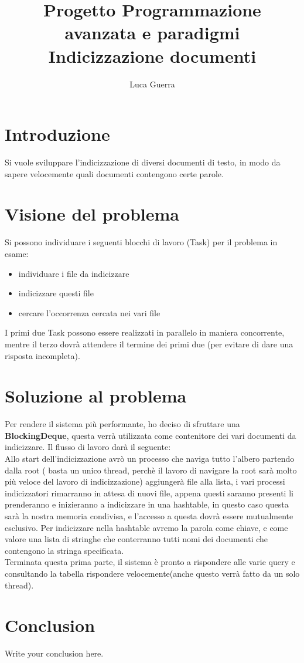 \documentclass{article}
\begin{document}
\title{Progetto Programmazione avanzata e paradigmi \\ Indicizzazione documenti}

\author{Luca Guerra}

\maketitle

\section{Introduzione}
Si vuole sviluppare l'indicizzazione di diversi documenti di testo, in modo da sapere velocemente quali documenti contengono certe parole.

\section{Visione del problema}
Si possono individuare i seguenti blocchi di lavoro (Task) per il problema in esame:
\begin{itemize}
  \item individuare i file da indicizzare
  \item indicizzare questi file
  \item cercare l'occorrenza cercata nei vari file
\end{itemize} 
I primi due Task possono essere realizzati in parallelo in maniera concorrente, mentre il terzo dovrà attendere il termine dei primi due (per evitare di dare una risposta incompleta).

\section{Soluzione al problema}

Per rendere il sistema più performante, ho deciso di sfruttare una \textbf{BlockingDeque}, questa verrà utilizzata come contenitore dei vari documenti da indicizzare. Il flusso di lavoro darà il seguente: \\
Allo start dell'indicizzazione avrò un processo che naviga tutto l'albero partendo dalla root ( basta un unico thread, perchè il lavoro di navigare la root sarà molto più veloce del lavoro di indicizzazione) aggiungerà file alla lista, i vari processi indicizzatori rimarranno in attesa di nuovi file, appena questi saranno presenti li prenderanno e inizieranno a indicizzare in una hashtable, in questo caso questa sarà la nostra memoria condivisa, e l'accesso a questa dovrà essere mutualmente esclusivo.
Per indicizzare nella hashtable avremo la parola come chiave, e come valore una lista di stringhe che conterranno tutti nomi dei documenti che contengono la stringa specificata.\\
Terminata questa prima parte, il sistema è pronto a rispondere alle varie query e consultando la tabella rispondere velocemente(anche questo verrà fatto da un solo thread).

\section{Conclusion}
Write your conclusion here.
\end{document}
